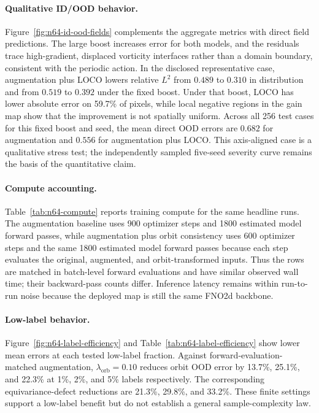 \paragraph{Qualitative ID/OOD behavior.} Figure~\ref{fig:n64-id-ood-fields} complements the aggregate metrics with direct field predictions. The large boost increases error for both models, and the residuals trace high-gradient, displaced vorticity interfaces rather than a domain boundary, consistent with the periodic action. In the disclosed representative case, augmentation plus LOCO lowers relative \(L^2\) from \(0.489\) to \(0.310\) in distribution and from \(0.519\) to \(0.392\) under the fixed boost. Under that boost, LOCO has lower absolute error on 59.7\% of pixels, while local negative regions in the gain map show that the improvement is not spatially uniform. Across all 256 test cases for this fixed boost and seed, the mean direct OOD errors are \(0.682\) for augmentation and \(0.556\) for augmentation plus LOCO. This axis-aligned case is a qualitative stress test; the independently sampled five-seed severity curve remains the basis of the quantitative claim.

\paragraph{Compute accounting.} Table~\ref{tab:n64-compute} reports training compute for the same headline runs. The augmentation baseline uses 900 optimizer steps and 1800 estimated model forward passes, while augmentation plus orbit consistency uses 600 optimizer steps and the same 1800 estimated model forward passes because each step evaluates the original, augmented, and orbit-transformed inputs. Thus the rows are matched in batch-level forward evaluations and have similar observed wall time; their backward-pass counts differ. Inference latency remains within run-to-run noise because the deployed map is still the same FNO2d backbone.

\paragraph{Low-label behavior.} Figure~\ref{fig:n64-label-efficiency} and Table~\ref{tab:n64-label-efficiency} show lower mean errors at each tested low-label fraction. Against forward-evaluation-matched augmentation, \(\lambda_{\mathrm{orb}}=0.10\) reduces orbit OOD error by 13.7\%, 25.1\%, and 22.3\% at 1\%, 2\%, and 5\% labels respectively. The corresponding equivariance-defect reductions are 21.3\%, 29.8\%, and 33.2\%. These finite settings support a low-label benefit but do not establish a general sample-complexity law.

